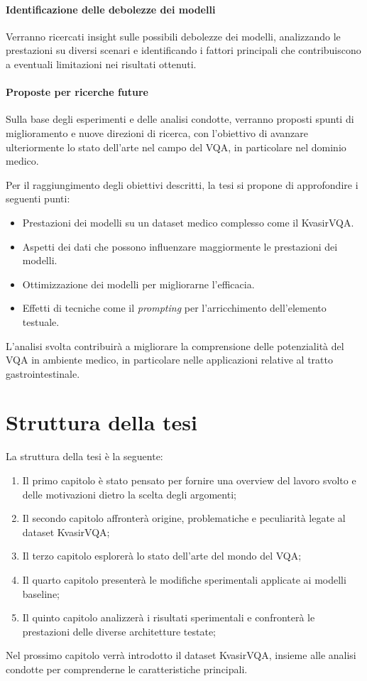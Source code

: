 \documentclass[../main.tex]{subfiles}
\begin{document}
\paragraph{Identificazione delle debolezze dei modelli}  
Verranno ricercati insight sulle possibili debolezze dei modelli, analizzando le prestazioni su diversi scenari e identificando i fattori principali che contribuiscono a eventuali limitazioni nei risultati ottenuti.

\paragraph{Proposte per ricerche future}  
Sulla base degli esperimenti e delle analisi condotte, verranno proposti spunti di miglioramento e nuove direzioni di ricerca, con l'obiettivo di avanzare ulteriormente lo stato dell'arte nel campo del VQA, in particolare nel dominio medico.

Per il raggiungimento degli obiettivi descritti, la tesi si propone di approfondire i seguenti punti:

\begin{itemize}
    \item Prestazioni dei modelli su un dataset medico complesso come il KvasirVQA.
    \item Aspetti dei dati che possono influenzare maggiormente le prestazioni dei modelli.
    \item Ottimizzazione dei modelli per migliorarne l'efficacia.
    \item Effetti di tecniche come il \textit{prompting} per l'arricchimento dell'elemento testuale.
\end{itemize}

L'analisi svolta contribuirà a migliorare la comprensione delle potenzialità del VQA in ambiente medico, in particolare nelle applicazioni relative al tratto gastrointestinale.

\section{Struttura della tesi}

La struttura della tesi è la seguente:

\begin{enumerate}
    \item Il primo capitolo è stato pensato per fornire una overview del lavoro svolto e delle motivazioni dietro la scelta degli argomenti;
    \item Il secondo capitolo affronterà origine, problematiche e peculiarità legate al dataset KvasirVQA;
    \item Il terzo capitolo esplorerà lo stato dell'arte del mondo del VQA;
    \item Il quarto capitolo presenterà le modifiche sperimentali applicate ai modelli baseline;
    \item Il quinto capitolo analizzerà i risultati sperimentali e confronterà le prestazioni delle diverse architetture testate;
\end{enumerate}

Nel prossimo capitolo verrà introdotto il dataset KvasirVQA, insieme alle analisi condotte per comprenderne le caratteristiche principali.
\end{document}

